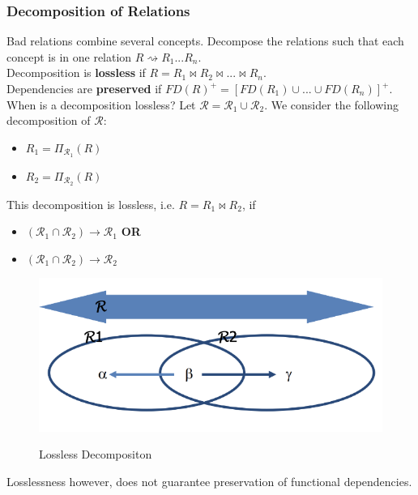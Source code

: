 \subsubsection{Decomposition of Relations}
Bad relations combine several concepts. Decompose the relations such that each concept is in one relation $R \rightsquigarrow R_1 ... R_n$.\\
Decomposition is \textbf{lossless} if $R = R_1 \Join R_2 \Join ... \Join R_n$.\\
Dependencies are \textbf{preserved} if $FD(R)^+ = [FD(R_1) \cup ... \cup FD(R_n)]^+$.\vspace{.3cm}\\
When is a decomposition lossless? Let $\mathcal{R} = \mathcal{R}_1 \cup \mathcal{R_2}$. We consider the following decomposition of $\mathcal{R}$:
\begin{itemize}
\item $R_1 = \Pi_{\mathcal{R}_1}(R)$
\item $R_2 = \Pi_{\mathcal{R}_2}(R)$
\end{itemize}
This decomposition is lossless, i.e. $R = R_1 \Join R_2$, if
\begin{itemize}
\item $(\mathcal{R}_1 \cap \mathcal{R}_2) \to \mathcal{R}_1$ \textbf{OR}
\item $(\mathcal{R}_1 \cap \mathcal{R}_2) \to \mathcal{R}_2$
\end{itemize}
\begin{figure}[H]
\centering
\includegraphics[width=.5\textwidth]{images/lossless_decomp.PNG}
\label{lossless_decomp}
\caption{Lossless Decompositon}
\end{figure}
Losslessness however, does not guarantee preservation of functional dependencies.

